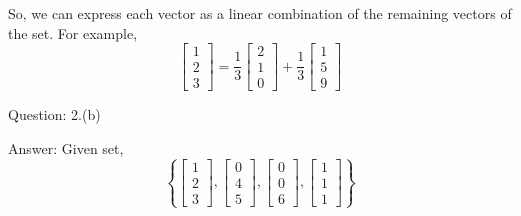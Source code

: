 \documentclass[a4paper]{article}
\begin{document}
\begin{qalist}
			So, we can express each vector as a linear combination of the remaining vectors of the set.
			For example, 
			\begin{equation}
				\left[\begin{matrix}1 \\ 2 \\ 3\end{matrix}\right] = 
				\frac{1}{3}\left[\begin{matrix}2 \\ 1 \\ 0\end{matrix}\right] +
				\frac{1}{3}\left[\begin{matrix}1 \\ 5 \\ 9\end{matrix}\right]
			\end{equation}
			
			\pagebreak
			
		\item[Question: 2.(b)] \setcounter{equation}{0} %
		\item[Answer:] Given set,
			\begin{equation}
				\left\{ \left[\begin{matrix}1 \\ 2 \\ 3\end{matrix}\right], 
					\left[\begin{matrix}0 \\ 4 \\ 5\end{matrix}\right], 
					\left[\begin{matrix}0 \\ 0 \\ 6\end{matrix}\right],
					\left[\begin{matrix}1 \\ 1 \\ 1\end{matrix}\right]
				\right\}
			\end{equation}
			

\end{qalist}
\end{document}
